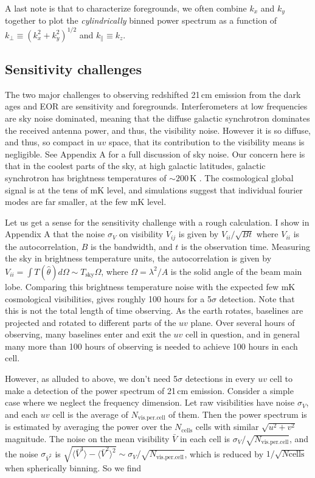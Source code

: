 A last note is that to characterize foregrounds, we often combine $k_x$ and $k_y$ together to plot the \textit{cylindrically} binned power spectrum as a function of $k_\perp\equiv(k_x^2+k_y^2)^{1/2}$ and $k_\parallel\equiv k_z$.




\subsection{Sensitivity challenges}
\label{sec:sensitivity}

The two major challenges to observing redshifted 21\,cm emission from the dark ages and EOR are sensitivity and foregrounds. Interferometers at low frequencies are sky noise dominated, meaning that the diffuse galactic synchrotron dominates the received antenna power, and thus, the visibility noise. However it is so diffuse, and thus, so compact in $uv$ space, that its contribution to the visibility means is negligible. See Appendix A for a full discussion of sky noise. Our concern here is that in the coolest parts of the sky, at high galactic latitudes, galactic synchrotron has brightness temperatures of $\sim200$\,K \citep{Tsysmemo}. The cosmological global signal is at the tens of mK level, and simulations suggest that individual fourier modes are far smaller, at the few mK level. 

Let us get a sense for the sensitivity challenge with a rough calculation. I show in Appendix A that the noise $\sigma_V$ on visibility $V_{ij}$ is given by $V_{ii}/\sqrt{Bt}$ where $V_{ii}$ is the autocorrelation, $B$ is the bandwidth, and $t$ is the observation time. Measuring the sky in brightness temperature units, the autocorrelation is given by $V_{ii}=\int T(\hat\theta)d\Omega\sim T_\text{sky}\Omega$, where $\Omega=\lambda^2/A$ is the solid angle of the beam main lobe. Comparing this brightness temperature noise with the expected few mK cosmological visibilities, gives roughly 100 hours for a 5$\sigma$ detection. Note that this is not the total length of time observing. As the earth rotates, baselines are projected and rotated to different parts of the $uv$ plane. Over several hours of observing, many baselines enter and exit the $uv$ cell in question, and in general many more than 100 hours of observing is needed to achieve 100 hours in each cell. 

However, as alluded to above, we don't need 5$\sigma$ detections in every $uv$ cell to make a detection of the power spectrum of 21\,cm emission. Consider a simple case where we neglect the frequency dimension. Let raw visibilities have noise $\sigma_V$, and each $uv$ cell is the average of $N_\text{vis.per.cell}$ of them. Then the power spectrum is is estimated by averaging the power over the $N_\text{cells}$ cells with similar $\sqrt{u^2+v^2}$ magnitude. The noise on the mean visibility $\bar{V}$ in each cell is $\sigma_V/\sqrt{N_\text{vis.per.cell}}$, and the noise $\sigma_{\bar V^2}$ is $\sqrt{\langle\bar V^4\rangle-\langle\bar V^2\rangle^2}\sim\sigma_V/\sqrt{N_\text{vis.per.cell}}$, which is reduced by $1/\sqrt{N\text{cells}}$ when spherically binning. So we find 

